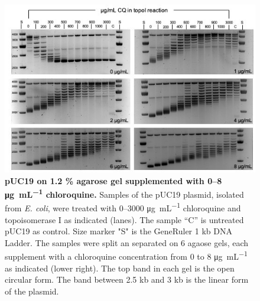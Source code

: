 \documentclass[10pt,letterpaper]{article}
\newcommand{\ugml}{\micro\gram\per\milli\liter}
\begin{document}
\begin{figure}[ht!]
    \includegraphics[width=\textwidth]{figures/keller_puc19.jpg}
  \caption{\textbf{pUC19 on 1.2 \% agarose gel supplemented with 0--8
      \si{\ugml} chloroquine.} Samples of the pUC19 plasmid, isolated
    from \textit{E. coli}, were treated with 0--3000 \si{\ugml}
    chloroquine and topoisomerase I as indicated (lanes). The sample
    “C” is untreated pUC19 as control. Size marker "S" is the
    GeneRuler 1 kb DNA Ladder. The samples were split an separated on
    6 agaose gels, each supplement with a chloroquine concentration
    from 0 to 8 \si{\ugml} as indicated (lower right). The top band
    in each gel is the open circular form. The band between  2.5 kb and 3 kb
    is the linear form of the plasmid.}
  \label{fig:keller} 
\end{figure}
\end{document}
